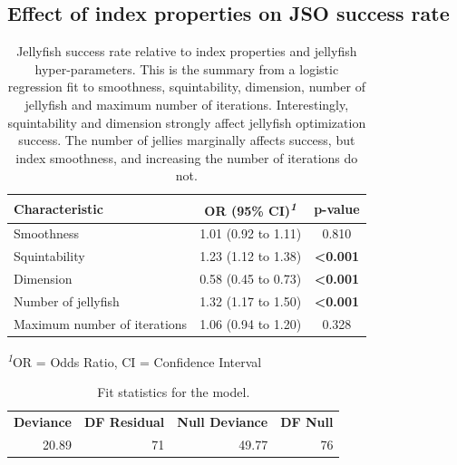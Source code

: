 \documentclass[
  12pt,
]{interact}
\theoremstyle{plain}
\begin{document}
\subsection{Effect of index properties on JSO success
rate}\label{effect-of-index-properties-on-jso-success-rate}

\begingroup
\fontsize{12.0pt}{14.4pt}\selectfont
\setlength{\LTpost}{0mm}

\begin{longtable}{lcc}

\caption{\label{tbl-mod-output}Jellyfish success rate relative to index
properties and jellyfish hyper-parameters. This is the summary from a
logistic regression fit to smoothness, squintability, dimension, number
of jellyfish and maximum number of iterations. Interestingly,
squintability and dimension strongly affect jellyfish optimization
success. The number of jellies marginally affects success, but index
smoothness, and increasing the number of iterations do not.}

\tabularnewline

\toprule
\textbf{Characteristic} & \textbf{OR} \textbf{(95\% CI)}\textsuperscript{\textit{1}} & \textbf{p-value} \\ 
\midrule\addlinespace[2.5pt]
Smoothness & 1.01 (0.92 to 1.11) & 0.810 \\ 
Squintability & 1.23 (1.12 to 1.38) & {\bfseries <0.001} \\ 
Dimension & 0.58 (0.45 to 0.73) & {\bfseries <0.001} \\ 
Number of jellyfish & 1.32 (1.17 to 1.50) & {\bfseries <0.001} \\ 
Maximum number of iterations & 1.06 (0.94 to 1.20) & 0.328 \\ 
\bottomrule

\end{longtable}

\begin{minipage}{\linewidth}
\textsuperscript{\textit{1}}OR = Odds Ratio, CI = Confidence Interval\\
\end{minipage}
\endgroup

\begingroup\fontsize{10}{12}\selectfont

\begin{longtable}[t]{rrrr}

\caption{\label{tbl-joint-output}Fit statistics for the model.}

\tabularnewline

\\
\toprule
\textbf{Deviance} & \textbf{DF Residual} & \textbf{Null Deviance} & \textbf{DF Null}\\
\midrule
20.89 & 71 & 49.77 & 76\\
\bottomrule

\end{longtable}
\end{document}
